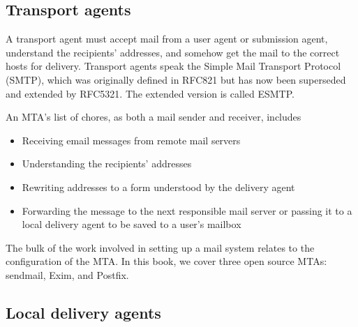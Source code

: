 \hypertarget{part0026_split_004.htmlux5cux23_idContainer1247}{}
\hypertarget{part0026_split_004.htmlux5cux23calibre_pb_3}{%
\subsection[Transport
agents]{\texorpdfstring{\protect\hypertarget{part0026_split_004.htmlux5cux23_idTextAnchor1006}{}{}Transport
agents}{Transport agents}}\label{part0026_split_004.htmlux5cux23calibre_pb_3}}

\protect\hypertarget{part0026_split_004.htmlux5cux23_idIndexMarker2406}{}{}\protect\hypertarget{part0026_split_004.htmlux5cux23_idIndexMarker2407}{}{}\protect\hypertarget{part0026_split_004.htmlux5cux23_idIndexMarker2408}{}{}A
transport agent must accept mail from a user agent or submission agent,
understand the recipients' addresses, and somehow get the mail to the
correct hosts for delivery. Transport agents speak the Simple Mail
Transport Protocol (SMTP), which was originally defined in RFC821 but
has now been superseded and extended by RFC5321. The extended version is
called
\protect\hypertarget{part0026_split_004.htmlux5cux23_idIndexMarker2409}{}{}ESMTP.

An MTA's list of chores, as both a mail sender and receiver, includes

\begin{itemize}
\item
  Receiving email messages from remote mail servers
\item
  Understanding the recipients' addresses
\item
  Rewriting addresses to a form understood by the delivery agent
\item
  Forwarding the message to the next responsible mail server or passing
  it to a local delivery agent to be saved to a user's mailbox
\end{itemize}

The bulk of the work involved in setting up a mail system relates to the
configuration of the MTA. In this book, we cover three open source MTAs:
{sendmail}, Exim, and Postfix.

\protect\hypertarget{part0026_split_005.html}{}{}

\hypertarget{part0026_split_005.htmlux5cux23_idContainer1247}{}
\hypertarget{part0026_split_005.htmlux5cux23calibre_pb_4}{%
\subsection[Local delivery
agents]{\texorpdfstring{\protect\hypertarget{part0026_split_005.htmlux5cux23_idTextAnchor1007}{}{}Local
delivery
agents}{Local delivery agents}}\label{part0026_split_005.htmlux5cux23calibre_pb_4}}

